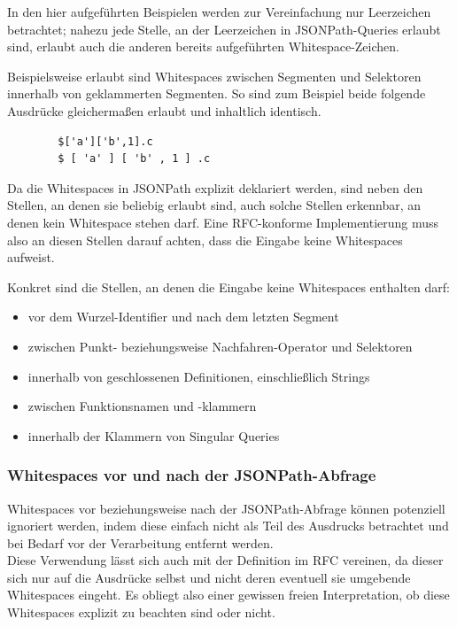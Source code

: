 \documentclass[oneside]{ausarbeitung}
\begin{document}
	In den hier aufgeführten Beispielen werden zur Vereinfachung nur Leerzeichen betrachtet; nahezu jede Stelle, an der Leerzeichen in JSONPath-Queries erlaubt sind, erlaubt auch die anderen bereits aufgeführten Whitespace-Zeichen.
	
	Beispielsweise erlaubt sind Whitespaces zwischen Segmenten und Selektoren innerhalb von geklammerten Segmenten. So sind zum Beispiel beide folgende Ausdrücke gleichermaßen erlaubt und inhaltlich identisch.
	
	\begin{lstlisting}
		$['a']['b',1].c
		$ [ 'a' ] [ 'b' , 1 ] .c
	\end{lstlisting}
		
	Da die Whitespaces in JSONPath explizit deklariert werden, sind neben den Stellen, an denen sie beliebig erlaubt sind, auch solche Stellen erkennbar, an denen kein Whitespace stehen darf. Eine RFC-konforme Implementierung muss also an diesen Stellen darauf achten, dass die Eingabe keine Whitespaces aufweist. 
	
	Konkret sind die Stellen, an denen die Eingabe keine Whitespaces enthalten darf:
	
	\begin{itemize}
		\item vor dem Wurzel-Identifier und nach dem letzten Segment
		\item zwischen Punkt- beziehungsweise Nachfahren-Operator und Selektoren
		\item innerhalb von geschlossenen Definitionen, einschließlich Strings
		\item zwischen Funktionsnamen und -klammern
		\item innerhalb der Klammern von Singular Queries
	\end{itemize}
	
	
	
	\subsubsection{Whitespaces vor und nach der JSONPath-Abfrage}
	
	Whitespaces vor beziehungsweise nach der JSONPath-Abfrage können potenziell ignoriert werden, indem diese einfach nicht als Teil des Ausdrucks betrachtet und bei Bedarf vor der Verarbeitung entfernt werden. \\
	Diese Verwendung lässt sich auch mit der Definition im RFC vereinen, da dieser sich nur auf die Ausdrücke selbst und nicht deren eventuell sie umgebende Whitespaces eingeht. Es obliegt also einer gewissen freien Interpretation, ob diese Whitespaces explizit zu beachten sind oder nicht. 
	
\end{document}
